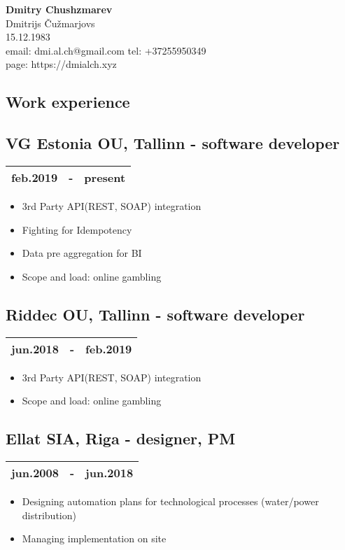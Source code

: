\documentclass[10pt]{article}
\begin{document}
\begingroup
\centering
\LARGE \textbf{Dmitry Chushzmarev}\\
\large Dmitrijs Čužmarjovs\\
\large 15.12.1983\\
\large email: dmi.al.ch@gmail.com tel: +37255950349\\
\large page: https://dmialch.xyz\\
\endgroup
\vspace{0.25em}

\begin{multicols*}{2}
\section*{Work experience}
\subsection*{VG Estonia OU, \textmd{Tallinn} - \textmd{software developer}}
\begin{tabular}{lll}
    feb.2019 & - & present\\
    \hline
\end{tabular}
\begin{itemize}
    \item 3rd Party API(REST, SOAP) integration
    \item Fighting for Idempotency
    \item Data pre aggregation for BI
    \item Scope and load: online gambling
\end{itemize}
\subsection*{Riddec OU, \textmd{Tallinn} - \textmd{software developer}}
\begin{tabular}{lll}
    jun.2018 & - & feb.2019\\
    \hline
\end{tabular}
\begin{itemize}
    \item 3rd Party API(REST, SOAP) integration
    \item Scope and load: online gambling
\end{itemize}
\subsection*{Ellat SIA, \textmd{Riga} - \textmd{designer, PM}}
\begin{tabular}{lll}
    jun.2008 & - & jun.2018\\
    \hline
\end{tabular}
\begin{itemize}
    \item Designing automation plans for technological processes (water/power distribution)
    \item Managing implementation on site
\end{itemize}

\end{multicols*}
\end{document}

